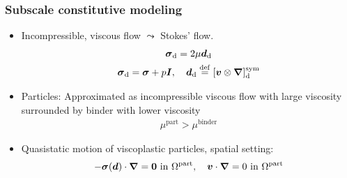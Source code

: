 \documentclass[11pt]{beamer} %
\renewcommand{\dev}{\mathrm{d}}
\newcommand{\particle}{\mathrm{part}}
\renewcommand{\alert}[1]{\textbf{#1}}
\begin{document}
\begin{frame}
 \frametitle{Subscale constitutive modeling}
 \begin{itemize}
  \item Incompressible, viscous flow $\leadsto$ Stokes' flow.
  \begin{gather*}
   \ts\sigma_\dev = 2\mu {\ts d}_\dev\\
   \ts\sigma_\dev = \ts\sigma + p\ts I,\quad \ts d_\dev \defeq [\ts v\outerp \diff]_\dev^\sym
  \end{gather*}
  \item Particles: Approximated as incompressible viscous flow with large viscosity surrounded by binder with lower viscosity
  \begin{align*}
   \mu^{\mathrm{part}} > \mu^{\mathrm{binder}}
  \end{align*}
  \item Quasistatic motion of viscoplastic particles, spatial setting:
  \begin{align*}
   -\ts\sigma(\ts d)\cdot\ta\nabla = \ta 0 \text{ in } \Omega^\particle,\quad \ta v\cdot\ta\nabla = 0 \text{ in } \Omega^\particle%
  \end{align*}
 \end{itemize}
\end{frame}
\end{document}
